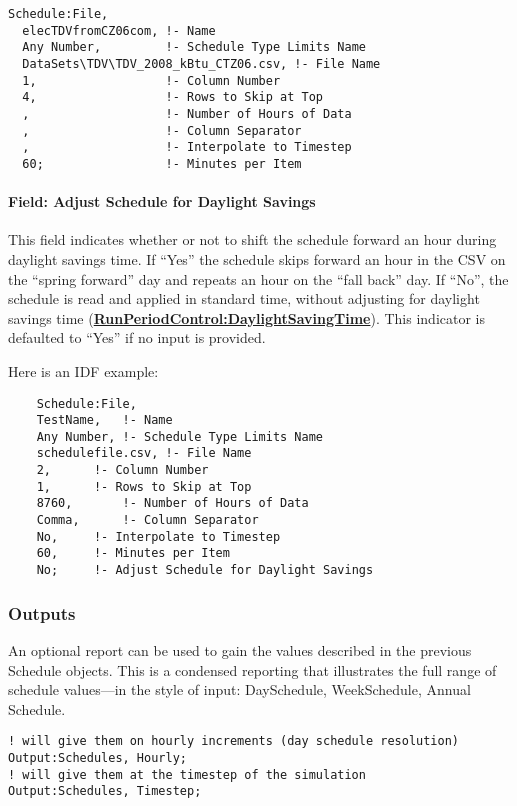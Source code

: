 \begin{lstlisting}
Schedule:File,
  elecTDVfromCZ06com, !- Name
  Any Number,         !- Schedule Type Limits Name
  DataSets\TDV\TDV_2008_kBtu_CTZ06.csv, !- File Name
  1,                  !- Column Number
  4,                  !- Rows to Skip at Top
  ,                   !- Number of Hours of Data
  ,                   !- Column Separator
  ,                   !- Interpolate to Timestep
  60;                 !- Minutes per Item
\end{lstlisting}

\paragraph{Field: Adjust Schedule for Daylight Savings}\label{adjust-schedule-for-daylight-savings-1}

This field indicates whether or not to shift the schedule forward an hour during daylight savings time. If ``Yes'' the schedule skips forward an hour in the CSV on the ``spring forward'' day and repeats an hour on the ``fall back'' day. If  ``No'', the schedule is read and applied in standard time, without adjusting for daylight savings time (\textbf{\hyperref[runperiodcontroldaylightsavingtime]{RunPeriodControl:DaylightSavingTime}}). This indicator is defaulted to ``Yes'' if no input is provided. 

Here is an IDF example:

\begin{lstlisting}
	Schedule:File,
	TestName,	!- Name
	Any Number,	!- Schedule Type Limits Name
	schedulefile.csv, !- File Name
	2,		!- Column Number
	1,		!- Rows to Skip at Top
	8760,		!- Number of Hours of Data
	Comma,		!- Column Separator
	No,		!- Interpolate to Timestep
	60,		!- Minutes per Item
	No;		!- Adjust Schedule for Daylight Savings
\end{lstlisting}

\subsubsection{Outputs}\label{outputs-031}

An optional report can be used to gain the values described in the previous Schedule objects. This is a condensed reporting that illustrates the full range of schedule values---in the style of input: DaySchedule, WeekSchedule, Annual Schedule.

\begin{lstlisting}
! will give them on hourly increments (day schedule resolution)
Output:Schedules, Hourly;
! will give them at the timestep of the simulation
Output:Schedules, Timestep;
\end{lstlisting}

